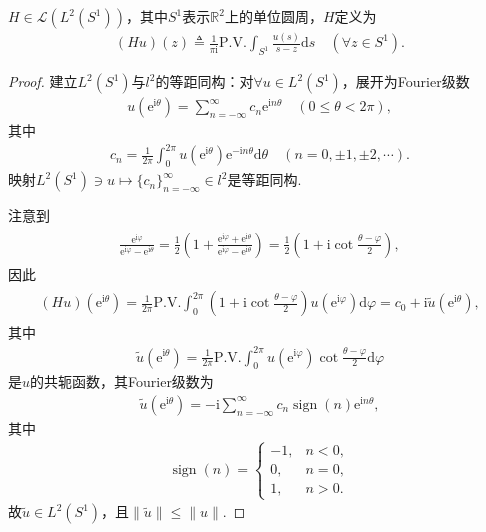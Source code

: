 \documentclass[../../main.tex]{subfiles}%
\begin{document}
\begin{proposition}
$H\in\mathscr{L}(L^2(S^1))$，其中$S^1$表示$\mathbb{R}^2$上的单位圆周，$H$定义为
\begin{align*}
(Hu)(z)\triangleq\frac{1}{\pi\mathrm{i}}\text{P.V.}\int_{S^1}\frac{u(s)}{s-z}\mathrm{d}s\quad (\forall z\in S^1).
\end{align*}
\end{proposition}
\begin{proof}

建立$L^2(S^1)$与$l^2$的等距同构：对$\forall u\in L^2(S^1)$，展开为Fourier级数
\begin{align*}
u(\mathrm{e}^{\mathrm{i}\theta})=\sum\limits_{n=-\infty}^{\infty}c_n\mathrm{e}^{\mathrm{i}n\theta}\quad (0\leqslant\theta<2\pi),
\end{align*}
其中
\begin{align*}
c_n=\frac{1}{2\pi}\int_{0}^{2\pi}u(\mathrm{e}^{\mathrm{i}\theta})\mathrm{e}^{-\mathrm{i}n\theta}\mathrm{d}\theta\quad (n=0,\pm1,\pm2,\cdots).
\end{align*}
映射$L^2(S^1)\ni u\mapsto\{c_n\}_{n=-\infty}^{\infty}\in l^2$是等距同构.

注意到
\begin{align*}
\begin{aligned}
\frac{\mathrm{e}^{\mathrm{i}\varphi}}{\mathrm{e}^{\mathrm{i}\varphi}-\mathrm{e}^{\mathrm{i}\theta}}=\frac{1}{2}\left(1+\frac{\mathrm{e}^{\mathrm{i}\varphi}+\mathrm{e}^{\mathrm{i}\theta}}{\mathrm{e}^{\mathrm{i}\varphi}-\mathrm{e}^{\mathrm{i}\theta}}\right)
=\frac{1}{2}\left(1+\mathrm{i}\cot\frac{\theta-\varphi}{2}\right),
\end{aligned}
\end{align*}
因此
\begin{align*}
\begin{aligned}
(Hu)(\mathrm{e}^{\mathrm{i}\theta})=\frac{1}{2\pi}\text{P.V.}\int_{0}^{2\pi}\left(1+\mathrm{i}\cot\frac{\theta-\varphi}{2}\right)u(\mathrm{e}^{\mathrm{i}\varphi})\mathrm{d}\varphi
=c_0+\mathrm{i}\widetilde{u}(\mathrm{e}^{\mathrm{i}\theta}),
\end{aligned}
\end{align*}
其中
\begin{align*}
\widetilde{u}(\mathrm{e}^{\mathrm{i}\theta})=\frac{1}{2\pi}\text{P.V.}\int_{0}^{2\pi}u(\mathrm{e}^{\mathrm{i}\varphi})\cot\frac{\theta-\varphi}{2}\mathrm{d}\varphi
\end{align*}
是$u$的共轭函数，其Fourier级数为
\begin{align*}
\widetilde{u}(\mathrm{e}^{\mathrm{i}\theta})=-\mathrm{i}\sum\limits_{n=-\infty}^{\infty}c_n\operatorname{sign}(n)\mathrm{e}^{\mathrm{i}n\theta},
\end{align*}
其中
\begin{align*}
\operatorname{sign}(n)=
\begin{cases}
-1,&n<0,\\
0,&n=0,\\
1,&n>0.
\end{cases}
\end{align*}
故$\widetilde{u}\in L^2(S^1)$，且$\|\widetilde{u}\|\leqslant\|u\|$.


\end{proof}
\end{document}
